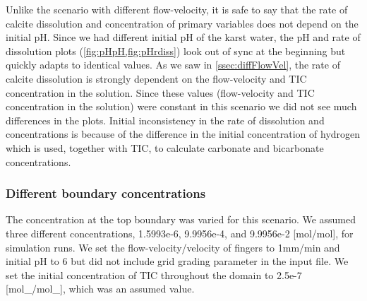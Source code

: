 Unlike the scenario with different flow-velocity, it is safe to say that the rate of calcite dissolution and concentration of primary variables 
does not depend on the initial pH. 
Since we had different initial pH of the karst water, the pH and rate of dissolution plots (\cref{fig:pHpH,fig:pHrdiss}) look out of sync at the beginning but quickly adapts to identical values. 
As we saw in \cref{ssec:diffFlowVel}, the rate of calcite dissolution is strongly dependent on the flow-velocity and TIC concentration in the solution. 
Since these values (flow-velocity and TIC concentration in the solution) were constant in this scenario we did not see much differences in the plots. Initial 
inconsistency in the rate of dissolution and concentrations is because of the difference in the initial concentration of hydrogen which is used, together with TIC, 
to calculate carbonate and bicarbonate concentrations. 


\subsubsection*{Different boundary  concentrations} \label{ssec:diffInitialBC}
The  concentration at the top boundary was varied for this scenario. We assumed three different  concentrations, 
1.5993e-6, 9.9956e-4, and 9.9956e-2 [mol/mol], for simulation runs. We set the flow-velocity/velocity of  fingers to 1mm/min 
and initial pH to 6 but did not include grid grading parameter in the input file. We set the initial concentration of 
TIC throughout the domain to 2.5e-7 [mol\_/mol\_], which was an assumed value. \\


